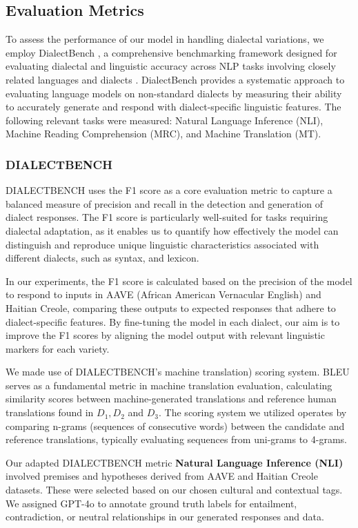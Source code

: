 \subsection{Evaluation Metrics}

To assess the performance of our model in handling dialectal variations, we employ DialectBench \cite{Faisal:24}, a comprehensive benchmarking framework designed for evaluating dialectal and linguistic accuracy across NLP tasks involving closely related languages and dialects \cite{Faisal:24}. DialectBench provides a systematic approach to evaluating language models on non-standard dialects by measuring their ability to accurately generate and respond with dialect-specific linguistic features. The following relevant tasks were measured: Natural Language Inference (NLI), Machine Reading Comprehension (MRC), and Machine Translation (MT).

\subsubsection{DIALECTBENCH}
DIALECTBENCH \cite{Faisal:24} uses the F1 score as a core evaluation metric to capture a balanced measure of precision and recall in the detection and generation of dialect responses. The F1 score is particularly well-suited for tasks requiring dialectal adaptation, as it enables us to quantify how effectively the model can distinguish and reproduce unique linguistic characteristics associated with different dialects, such as syntax, and lexicon. 

In our experiments, the F1 score is calculated based on the precision of the model to respond to inputs in AAVE (African American Vernacular English) and Haitian Creole, comparing these outputs to expected responses that adhere to dialect-specific features. By fine-tuning the model in each dialect, our aim is to improve the F1 scores by aligning the model output with relevant linguistic markers for each variety.

We made use of DIALECTBENCH's machine translation) scoring system. BLEU serves as a fundamental metric in machine translation evaluation, calculating similarity scores between machine-generated translations and reference human translations found in $D_1, D_2$ and $D_3$. The scoring system we utilized operates by comparing n-grams (sequences of consecutive words) between the candidate and reference translations, typically evaluating sequences from uni-grams to 4-grams.

Our adapted DIALECTBENCH \cite{Faisal:24} metric \textbf{Natural Language Inference (NLI)} involved premises and hypotheses derived from AAVE and Haitian Creole datasets. These were selected based on our chosen cultural and contextual tags. We assigned GPT-4o to annotate ground truth labels for entailment, contradiction, or neutral relationships in our generated responses and data. 

